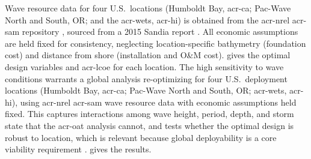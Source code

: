     Wave resource data for four U.S.\ locations (Humboldt Bay, \gls{acr-ca}; Pac-Wave North and South, OR; and the \gls{acr-wets}, \gls{acr-hi}) is obtained from the \gls{acr-nrel} \gls{acr-sam} repository \citep{janzou_sam_2022}, sourced from a 2015 Sandia report \citep{dallman_characterization_2015}.
    All economic assumptions are held fixed for consistency, neglecting location-specific bathymetry (foundation cost) and distance from shore (installation and O\&M cost).
     gives the optimal design variables and \gls{acr-lcoe} for each location.
\else
    The high sensitivity to wave conditions warrants a global analysis re-optimizing for four U.S.\ deployment locations (Humboldt Bay, \gls{acr-ca}; Pac-Wave North and South, OR; \gls{acr-wets}, \gls{acr-hi}), using \gls{acr-nrel} \gls{acr-sam} wave resource data \citep{janzou_sam_2022,dallman_characterization_2015} with economic assumptions held fixed.
    This captures interactions among wave height, period, depth, and storm state that the \gls{acr-oat} analysis cannot, and tests whether the optimal design is robust to location, which is relevant because global deployability is a core viability requirement \citep{bull_systems_2017}.
     gives the results.
\fi
\begin{table}[htbp]\centering
\setlength\arraycolsep{1pt}

\caption{Results for Re-Optimization in Four Distinct Locations}
\label{remdo:tab:location}
\end{table}

